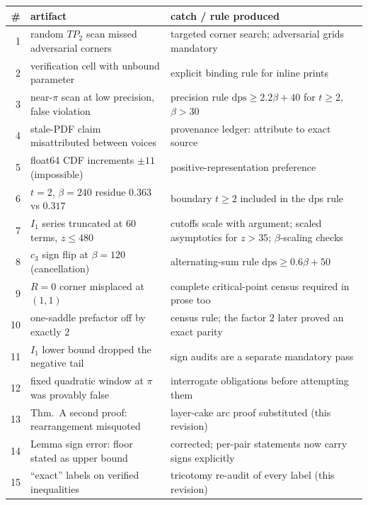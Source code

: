\documentclass[11pt]{article}
\theoremstyle{remark}
\begin{document}
\begin{center}\small
\begin{tabular}{@{}rp{5.0cm}p{7.6cm}@{}}
\toprule
\# & artifact & catch / rule produced\\
\midrule
1 & random $TP_2$ scan missed adversarial corners & targeted corner
search; adversarial grids mandatory\\
2 & verification cell with unbound parameter & explicit binding rule for
inline prints\\
3 & near-$\pi$ scan at low precision, false violation & precision rule
$\mathrm{dps}\ge2.2\beta+40$ for $t\ge2$, $\beta>30$\\
4 & stale-PDF claim misattributed between voices & provenance ledger:
attribute to exact source\\
5 & float64 CDF increments $\pm11$ (impossible) & positive-representation
preference\\
6 & $t{=}2$, $\beta{=}240$ residue $0.363$ vs $0.317$ & boundary $t\ge2$
included in the dps rule\\
7 & $I_1$ series truncated at $60$ terms, $z\le480$ & cutoffs scale with
argument; scaled asymptotics for $z>35$; $\beta$-scaling checks\\
8 & $c_3$ sign flip at $\beta=120$ (cancellation) & alternating-sum rule
$\mathrm{dps}\ge0.6\beta+50$\\
9 & $R=0$ corner misplaced at $(1,1)$ & complete critical-point census
required in prose too\\
10 & one-saddle prefactor off by exactly $2$ & census rule; the factor
$2$ later proved an exact parity\\
11 & $I_1$ lower bound dropped the negative tail & sign audits are a
separate mandatory pass\\
12 & fixed quadratic window at $\pi$ was provably false & interrogate
obligations before attempting them\\
13 & Thm.~A second proof: rearrangement misquoted & layer-cake arc proof
substituted (this revision)\\
14 & Lemma sign error: floor stated as upper bound & corrected; per-pair
statements now carry signs explicitly\\
15 & ``exact'' labels on verified inequalities & tricotomy re-audit of
every label (this revision)\\
\bottomrule
\end{tabular}
\end{center}
\end{document}
